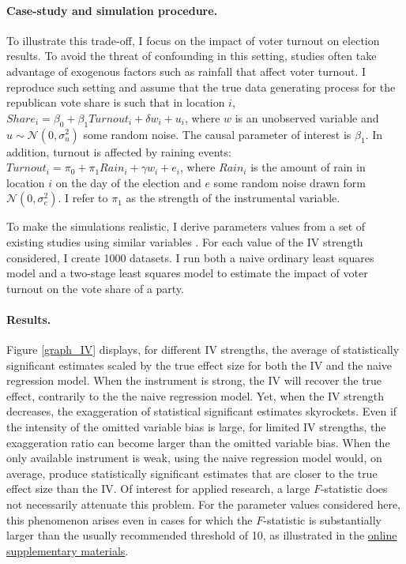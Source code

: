 \documentclass[usletter, 12pt]{article}
\begin{document}
        			\paragraph{Case-study and simulation procedure.} 
        			To illustrate this trade-off, I focus on the impact of voter turnout on election results. To avoid the threat of confounding in this setting, studies often take advantage of exogenous factors such as rainfall that affect voter turnout. I reproduce such setting and assume that the true data generating process for the republican vote share is such that  in location $i$, $Share_{i} = \beta_{0} + \beta_{1} Turnout_{i} + \delta w_{i} + u_{i}$, where $w$ is an unobserved variable and $u \sim \mathcal{N}(0, \sigma_{u}^{2})$ some random noise. The causal parameter of interest is $\beta_{1}$. In addition, turnout is affected by raining events: $Turnout_{i} = \pi_{0} + \pi_{1} Rain_{i} + \gamma w_{i} + e_{i}$, where $Rain_{i}$ is the amount of rain in location $i$ on the day of the election 
			and $e$ some random noise drawn form $\mathcal{N}(0, \sigma_{e}^{2})$. I refer to $\pi_{1}$ as the strength of the instrumental variable. 
        			
        			To make the simulations realistic, I derive parameters values from a set of existing studies using similar variables \citep{gomez_republicans_2007, fujiwara_habit_2016, cooperman_randomization_2017}. For each value of the IV strength considered, I create 1000 datasets. I run both a naive ordinary least squares model and a two-stage least squares model to estimate the impact of voter turnout on the vote share of a party.
        			
        			\paragraph{Results.} 
			Figure \ref{graph_IV} displays, for different IV strengths, the average of statistically significant estimates scaled by the true effect size for both the IV and the naive regression model. When the instrument is strong, the IV will recover the true effect, contrarily to the the naive regression model. Yet, when the IV strength decreases, the exaggeration of statistical significant estimates skyrockets. Even if the intensity of the omitted variable bias is large, for limited IV strengths, the exaggeration ratio can become larger than the omitted variable bias. When the only available instrument is weak, using the naive regression model would, on average, produce statistically significant estimates that are closer to the true effect size than the IV. Of interest for applied research, a large $F$-statistic does not necessarily attenuate this problem. For the parameter values considered here, this phenomenon arises even in cases for which the $F$-statistic is substantially larger than the usually recommended threshold of 10, as illustrated in the \href{https://vincentbagilet.github.io/causal_inflation/IV.html#f-statistic-analysis}{online supplementary materials}. 
        		
\end{document}
